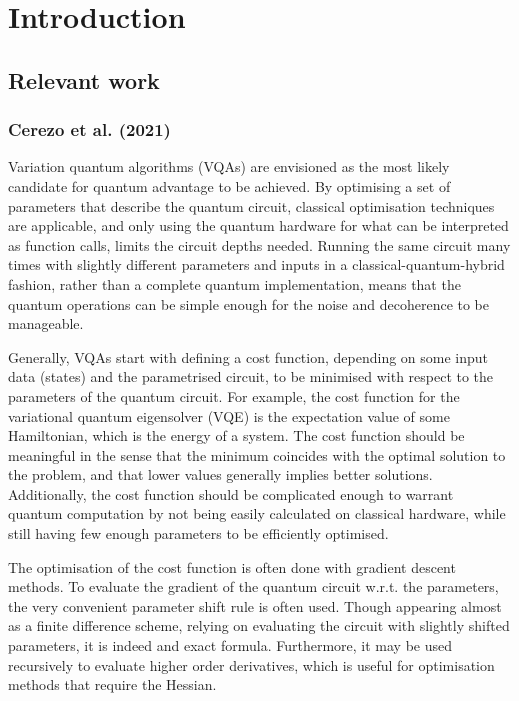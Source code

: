 \chapter{Introduction}

\section{Relevant work}


\subsection{Cerezo et al. (2021)}
Variation quantum algorithms (VQAs) are envisioned as the most likely candidate for quantum advantage to be achieved. By optimising a set of parameters that describe the quantum circuit, classical optimisation techniques are applicable, and only using the quantum hardware for what can be interpreted as function calls, limits the circuit depths needed. Running the same circuit many times with slightly different parameters and inputs in a classical-quantum-hybrid fashion, rather than a complete quantum implementation, means that the quantum operations can be simple enough for the noise and decoherence to be manageable.

Generally, VQAs start with defining a cost function, depending on some input data (states) and the parametrised circuit, to be minimised with respect to the parameters of the quantum circuit. For example, the cost function for the variational quantum eigensolver (VQE) is the expectation value of some Hamiltonian, which is the energy of a system. The cost function should be meaningful in the sense that the minimum coincides with the optimal solution to the problem, and that lower values generally implies better solutions. Additionally, the cost function should be complicated enough to warrant quantum computation by not being easily calculated on classical hardware, while still having few enough parameters to be efficiently optimised.

The optimisation of the cost function is often done with gradient descent methods. To evaluate the gradient of the quantum circuit w.r.t. the parameters, the very convenient parameter shift rule is often used. Though appearing almost as a finite difference scheme, relying on evaluating the circuit with slightly shifted parameters, it is indeed and exact formula. Furthermore, it may be used recursively to evaluate higher order derivatives, which is useful for optimisation methods that require the Hessian.

